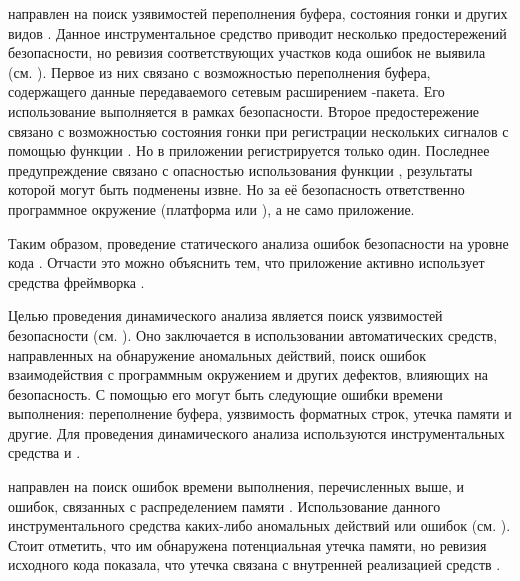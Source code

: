 %
 направлен на поиск узявимостей переполнения буфера, состояния гонки и других видов . 
%
Данное инструментальное средство приводит несколько предостережений безопасности, но ревизия соответствующих участков кода ошибок не выявила (см. ). 
%
Первое из них связано с возможностью переполнения буфера, содержащего данные передаваемого сетевым расширением -пакета. 
%
Его использование выполняется в рамках безопасности. 
%
Второе предостережение связано с возможностью состояния гонки при регистрации нескольких сигналов с помощью функции . 
%
Но в приложении регистрируется только один. 
%
Последнее предупреждение связано с опасностью использования функции , результаты которой могут быть подменены извне. 
%
Но за её безопасность ответственно программное окружение  (платформа или ), а не само приложение.  

%
Таким образом, проведение статического анализа  ошибок безопасности на уровне кода . 
%
Отчасти это можно объяснить тем, что приложение активно использует средства фреймворка . 



%
Целью проведения динамического анализа является поиск уязвимостей безопасности  (см. ). 
%
Оно заключается в использовании автоматических средств, направленных на обнаружение аномальных действий, поиск ошибок взаимодействия с программным окружением и других дефектов, влияющих на безопасность. 
%
С помощью его могут быть следующие ошибки времени выполнения: переполнение буфера, уязвимость форматных строк, утечка памяти и другие. 
%
Для проведения динамического анализа  используются инструментальных средства  и . 

%
 направлен на поиск ошибок времени выполнения, перечисленных выше, и ошибок, связанных с распределением памяти . 
%
Использование данного инструментального средства каких-либо аномальных действий или ошибок  (см. ). 
%
Стоит отметить, что им обнаружена потенциальная утечка памяти, но ревизия исходного кода  показала, что утечка связана с внутренней реализацией средств . 


